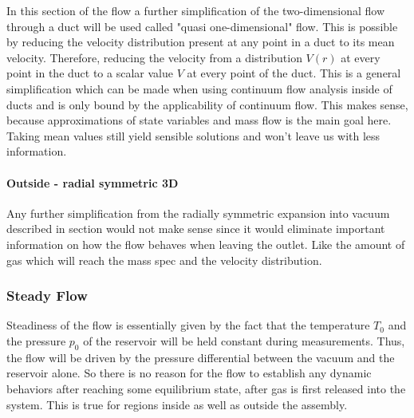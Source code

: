 		In this section of the flow a further simplification of the two-dimensional flow through a duct will be used called "quasi one-dimensional" flow.
		This is possible by reducing the velocity distribution present at any point in a duct to its mean velocity.
		Therefore, reducing the velocity from a distribution $V(r)$ at every point in the duct to a scalar value $V$ at every point of the duct.
		This is a general simplification which can be made when using continuum flow analysis inside of ducts and is only bound by the applicability of continuum flow.
		This makes sense, because approximations of state variables and mass flow is the main goal here.
		Taking mean values still yield sensible solutions and won't leave us with less information.

	\paragraph{Outside - radial symmetric 3D}

		Any further simplification from the radially symmetric expansion into vacuum described in section would not make sense since it would eliminate important information on how the flow behaves when leaving the outlet.
		Like the amount of gas which will reach the mass spec and the velocity distribution.
\cite{anderson2021modern}

\subsubsection{Steady Flow}

	Steadiness of the flow is essentially given by the fact that the temperature $T_0$ and the pressure $p_0$ of the reservoir will be held constant during measurements.
	Thus, the flow will be driven by the pressure differential between the vacuum and the reservoir alone.
	So there is no reason for the flow to establish any dynamic behaviors after reaching some equilibrium state, after gas is first released into the system.
	This is true for regions inside as well as outside the assembly.
